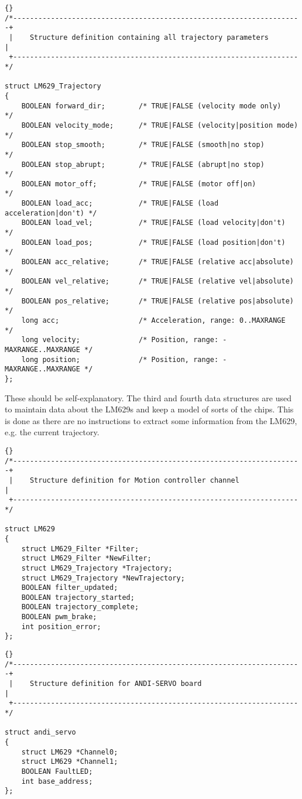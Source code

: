 \documentclass[a4paper,11pt]{article}
\begin{document}
\begin{lstlisting}{}
/*---------------------------------------------------------------------+
 |    Structure definition containing all trajectory parameters        |
 +--------------------------------------------------------------------*/

struct LM629_Trajectory
{
	BOOLEAN forward_dir;		/* TRUE|FALSE (velocity mode only)      */
	BOOLEAN velocity_mode;		/* TRUE|FALSE (velocity|position mode)  */
	BOOLEAN stop_smooth;		/* TRUE|FALSE (smooth|no stop)          */
	BOOLEAN stop_abrupt;		/* TRUE|FALSE (abrupt|no stop)          */
	BOOLEAN motor_off;			/* TRUE|FALSE (motor off|on)            */
	BOOLEAN load_acc;			/* TRUE|FALSE (load acceleration|don't) */
	BOOLEAN load_vel;			/* TRUE|FALSE (load velocity|don't)     */
	BOOLEAN load_pos;			/* TRUE|FALSE (load position|don't)     */
	BOOLEAN acc_relative;		/* TRUE|FALSE (relative acc|absolute)   */
	BOOLEAN vel_relative;		/* TRUE|FALSE (relative vel|absolute)   */
	BOOLEAN pos_relative;		/* TRUE|FALSE (relative pos|absolute)   */
	long acc;					/* Acceleration, range: 0..MAXRANGE     */
	long velocity;				/* Position, range: -MAXRANGE..MAXRANGE */
	long position;				/* Position, range: -MAXRANGE..MAXRANGE */
};
\end{lstlisting}

These should be self-explanatory. 
The third and fourth data structures are used to maintain data about the
LM629s and keep a model of sorts of the chips. This is done as there are
no instructions to extract some information from the LM629, e.g. the
current trajectory. 

\begin{lstlisting}{}
/*---------------------------------------------------------------------+
 |    Structure definition for Motion controller channel               |
 +--------------------------------------------------------------------*/

struct LM629
{
	struct LM629_Filter *Filter;
	struct LM629_Filter *NewFilter;
	struct LM629_Trajectory *Trajectory;
	struct LM629_Trajectory *NewTrajectory;
	BOOLEAN filter_updated;
	BOOLEAN trajectory_started;
	BOOLEAN trajectory_complete;
	BOOLEAN pwm_brake;
	int position_error;
};
\end{lstlisting}

\begin{lstlisting}{}
/*---------------------------------------------------------------------+
 |    Structure definition for ANDI-SERVO board                        |
 +--------------------------------------------------------------------*/

struct andi_servo
{
	struct LM629 *Channel0;
	struct LM629 *Channel1;
	BOOLEAN FaultLED;
	int base_address;
};
\end{lstlisting}
\end{document}

